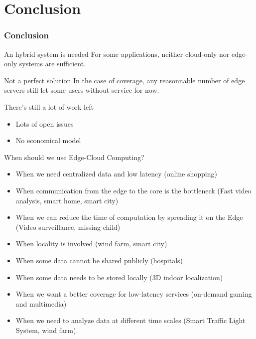 \documentclass[utf8,xcolor=table, page number]{earlywinter}
\begin{document}
\section{Conclusion}

\begin{frame}
  \frametitle{Conclusion}

  \begin{block}{An hybrid system is needed}
    For some applications, neither cloud-only nor edge-only systems are sufficient.
  \end{block}
  
  \begin{alertblock}{Not a perfect solution}
    In the case of coverage, any reasonnable number of edge servers still let some users without service for now.
  \end{alertblock}
  
  \begin{alertblock}{There's still a lot of work left}
    \begin{itemize}
      \item Lots of open issues
      \item No economical model
    \end{itemize}
  \end{alertblock}

  
\end{frame}


\begin{frame}{When should we use Edge-Cloud Computing?}
\begin{itemize}
\item When we need centralized data and low latency (online shopping)
\item When communication from the edge to the core is the bottleneck (Fast video analysis, smart home, smart city)
\item When we can reduce the time of computation by spreading it on the Edge (Video surveillance, missing child)
\item When locality is involved (wind farm, smart city)
\item When some data cannot be shared publicly (hospitals)
\item When some data needs to be stored locally (3D indoor localization)
\item When we want a better coverage for low-latency services (on-demand gaming and multimedia)
\item When we need to analyze data at different time scales (Smart Traffic Light System, wind farm). 
\end{itemize}
\end{frame}
\end{document}
